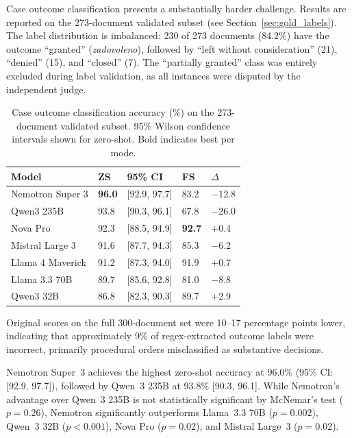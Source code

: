 \documentclass[11pt,a4paper]{article}
\begin{document}
Case outcome classification presents a substantially harder challenge. Results are reported on the 273-document validated subset (see Section~\ref{sec:gold_labels}). The label distribution is imbalanced: 230 of 273 documents (84.2\%) have the outcome ``granted'' (\textit{zadovoleno}), followed by ``left without consideration'' (21), ``denied'' (15), and ``closed'' (7). The ``partially granted'' class was entirely excluded during label validation, as all instances were disputed by the independent judge.

\begin{table}[t]
\centering
\caption{Case outcome classification accuracy (\%) on the 273-document validated subset. 95\% Wilson confidence intervals shown for zero-shot. Bold indicates best per mode.}
\label{tab:case_outcome}
\begin{tabular}{lR{1.6cm}R{2.6cm}R{1.6cm}R{1.6cm}}
\toprule
\textbf{Model} & \textbf{ZS} & \textbf{95\% CI} & \textbf{FS} & \textbf{$\Delta$} \\
\midrule
Nemotron Super 3  & \textbf{96.0} & [92.9, 97.7] & 83.2 & $-$12.8 \\
Qwen3 235B        & 93.8          & [90.3, 96.1] & 67.8 & $-$26.0 \\
Nova Pro          & 92.3          & [88.5, 94.9] & \textbf{92.7} & $+$0.4 \\
Mistral Large 3   & 91.6          & [87.7, 94.3] & 85.3 & $-$6.2 \\
Llama 4 Maverick  & 91.2          & [87.3, 94.0] & 91.9 & $+$0.7 \\
Llama 3.3 70B     & 89.7          & [85.6, 92.8] & 81.0 & $-$8.8 \\
Qwen3 32B         & 86.8          & [82.3, 90.3] & 89.7 & $+$2.9 \\
\bottomrule
\end{tabular}
\end{table}


Original scores on the full 300-document set were 10--17 percentage points lower, indicating that approximately 9\% of regex-extracted outcome labels were incorrect, primarily procedural orders misclassified as substantive decisions.

Nemotron Super~3 achieves the highest zero-shot accuracy at 96.0\% (95\% CI: [92.9, 97.7]), followed by Qwen~3 235B at 93.8\% [90.3, 96.1]. While Nemotron's advantage over Qwen~3 235B is not statistically significant by McNemar's test ($p = 0.26$), Nemotron significantly outperforms Llama~3.3 70B ($p = 0.002$), Qwen~3 32B ($p < 0.001$), Nova Pro ($p = 0.02$), and Mistral Large~3 ($p = 0.02$).
\end{document}
